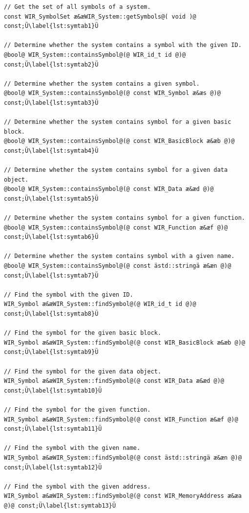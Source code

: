 \begin{lstlisting}[style=code,float=t,caption={Symbol Handling of Class \texttt{WIR\_System}},label=lst:symtab]
// Get the set of all symbols of a system.
const WIR_SymbolSet æ&æWIR_System::getSymbols@( void )@ const;Ü\label{lst:symtab1}Ü

// Determine whether the system contains a symbol with the given ID.
@bool@ WIR_System::containsSymbol@(@ WIR_id_t id @)@ const;Ü\label{lst:symtab2}Ü

// Determine whether the system contains a given symbol.
@bool@ WIR_System::containsSymbol@(@ const WIR_Symbol æ&æs @)@ const;Ü\label{lst:symtab3}Ü

// Determine whether the system contains symbol for a given basic block.
@bool@ WIR_System::containsSymbol@(@ const WIR_BasicBlock æ&æb @)@ const;Ü\label{lst:symtab4}Ü

// Determine whether the system contains symbol for a given data object.
@bool@ WIR_System::containsSymbol@(@ const WIR_Data æ&æd @)@ const;Ü\label{lst:symtab5}Ü

// Determine whether the system contains symbol for a given function.
@bool@ WIR_System::containsSymbol@(@ const WIR_Function æ&æf @)@ const;Ü\label{lst:symtab6}Ü

// Determine whether the system contains symbol with a given name.
@bool@ WIR_System::containsSymbol@(@ const ästd::stringä æ&æn @)@ const;Ü\label{lst:symtab7}Ü

// Find the symbol with the given ID.
WIR_Symbol æ&æWIR_System::findSymbol@(@ WIR_id_t id @)@ const;Ü\label{lst:symtab8}Ü

// Find the symbol for the given basic block.
WIR_Symbol æ&æWIR_System::findSymbol@(@ const WIR_BasicBlock æ&æb @)@ const;Ü\label{lst:symtab9}Ü

// Find the symbol for the given data object.
WIR_Symbol æ&æWIR_System::findSymbol@(@ const WIR_Data æ&æd @)@ const;Ü\label{lst:symtab10}Ü

// Find the symbol for the given function.
WIR_Symbol æ&æWIR_System::findSymbol@(@ const WIR_Function æ&æf @)@ const;Ü\label{lst:symtab11}Ü

// Find the symbol with the given name.
WIR_Symbol æ&æWIR_System::findSymbol@(@ const ästd::stringä æ&æn @)@ const;Ü\label{lst:symtab12}Ü

// Find the symbol with the given address.
WIR_Symbol æ&æWIR_System::findSymbol@(@ const WIR_MemoryAddress æ&æa @)@ const;Ü\label{lst:symtab13}Ü
\end{lstlisting}


